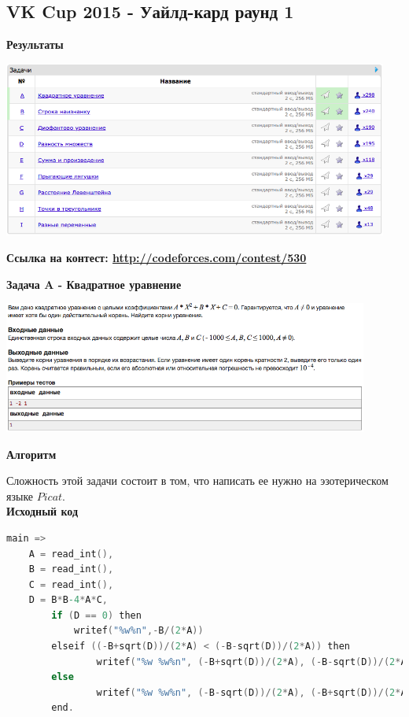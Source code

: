 \documentclass[a4paper,12pt]{article}
\begin{document}
\newpage
\subsection{ VK Cup 2015 - Уайлд-кард раунд 1}

\textbf{{\large Результаты}} \\
\begin{center}
\includegraphics[width=0.95\textwidth]{VK_1/A_VK_1_result.png}\\ [1cm]
\end{center}

\textbf{{\large Ссылка на контест: \url{http://codeforces.com/contest/530}}}

\newpage
\textbf{{\large Задача A - Квадратное уравнение}} \\
\begin{center}
\includegraphics[width=0.9\textwidth]{VK_1/VK_1_A.png}\\ [1cm]
\end{center}

\textbf{{\large Алгоритм}}

Сложность этой задачи состоит в том, что написать ее нужно на эзотерическом языке $Picat$.\\

\textbf{{\large Исходный код}} \\
\begin{lstlisting}[language=C]
main =>
    A = read_int(),
    B = read_int(),
    C = read_int(),
    D = B*B-4*A*C,
        if (D == 0) then
            writef("%w%n",-B/(2*A))
        elseif ((-B+sqrt(D))/(2*A) < (-B-sqrt(D))/(2*A)) then
                writef("%w %w%n", (-B+sqrt(D))/(2*A), (-B-sqrt(D))/(2*A))
        else
                writef("%w %w%n", (-B-sqrt(D))/(2*A), (-B+sqrt(D))/(2*A))
        end.
\end{lstlisting}
\newpage
\end{document}
